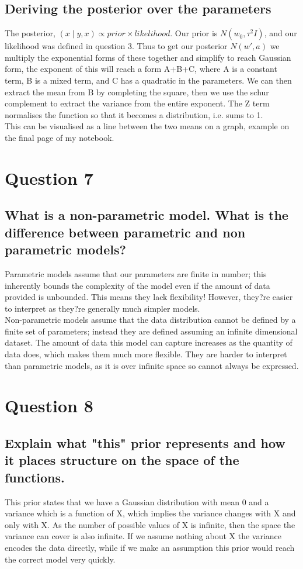 \documentclass[a4paper, 9pt]{article}
\begin{document}
\subsection*{Deriving the posterior over the parameters}
The posterior, \( (x \mid y, x) \propto prior \times likelihood \). Our prior is \( N(w_{0} ,\tau^{2} I) \), and our likelihood was defined in question 3. Thus to get our posterior \( N(w', a) \) we multiply the exponential forms of these together and simplify to reach Gaussian form, the exponent of this will reach a form A+B+C, where A is a constant term, B is a mixed term, and C has a quadratic in the parameters. We can then extract the mean from B by completing the square, then we use the schur complement to extract the variance from the entire exponent. The Z term normalises the function so that it becomes a distribution, i.e. sums to 1.  \\
This can be visualised as a line between the two means on a graph, example on the final page of my notebook.

\section*{Question 7}
\subsection*{What is a non-parametric model. What is the difference between parametric and non parametric models?}
Parametric models assume that our parameters are finite in number; this inherently bounds the complexity of the model even if the amount of data provided is unbounded. This means they lack flexibility! However, they?re easier to interpret as they?re generally much simpler models. \\
Non-parametric models assume that the data distribution cannot be defined by a finite set of parameters; instead they are defined assuming an infinite dimensional dataset. The amount of data this model can capture increases as the quantity of data does, which makes them much more flexible. They are harder to interpret than parametric models, as it is over infinite space so cannot always be expressed. 

\section*{Question 8}
\subsection*{Explain what "this" prior represents and how it places structure on the space of the functions.}
This prior states that we have a Gaussian distribution with mean 0 and a variance which is a function of X, which implies the variance changes with X and only with X. As the number of possible values of X is infinite, then the space the variance can cover is also infinite. If we assume nothing about X the variance encodes the data directly, while if we make an assumption this prior would reach the correct model very quickly.
\end{document}
